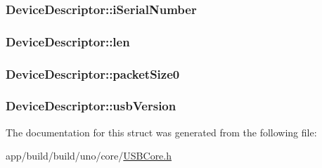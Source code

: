 \hypertarget{struct_device_descriptor_ae32967caa0dac5acf905110bfff7f303}{
\subsubsection[{i\-Serial\-Number}]{ Device\-Descriptor\-::i\-Serial\-Number}}\label{struct_device_descriptor_ae32967caa0dac5acf905110bfff7f303}
\hypertarget{struct_device_descriptor_a8b86e2bfea757362b072d295be2380bd}{
\subsubsection[{len}]{ Device\-Descriptor\-::len}}\label{struct_device_descriptor_a8b86e2bfea757362b072d295be2380bd}
\hypertarget{struct_device_descriptor_ae76e33e00fdb69440bbc8ebc2ad294ec}{
\subsubsection[{packet\-Size0}]{ Device\-Descriptor\-::packet\-Size0}}\label{struct_device_descriptor_ae76e33e00fdb69440bbc8ebc2ad294ec}
\hypertarget{struct_device_descriptor_a8f922d8b2a0d01aa88490ef96526d4a0}{
\subsubsection[{usb\-Version}]{ Device\-Descriptor\-::usb\-Version}}\label{struct_device_descriptor_a8f922d8b2a0d01aa88490ef96526d4a0}


The documentation for this struct was generated from the following file\-:\begin{DoxyCompactItemize}
\item 
app/build/build/uno/core/\hyperlink{_u_s_b_core_8h}{U\-S\-B\-Core.\-h}\end{DoxyCompactItemize}
